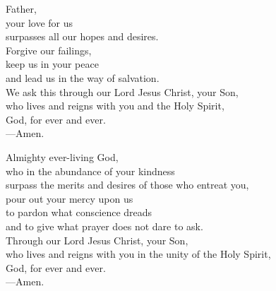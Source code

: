 \prayer


\begin{prayerverse}
Father,\\
your love for us\\
surpasses all our hopes and desires.\\
Forgive our failings,\\
keep us in your peace\\
and lead us in the way of salvation.\\
We ask this through our Lord Jesus Christ, your Son,\\
who lives and reigns with you and the Holy Spirit,\\
God, for ever and ever.\\
{\color{red}---\thinspace}Amen.
\end{prayerverse}


\begin{prayerverse}
Almighty ever-living God,\\
who in the abundance of your kindness\\
surpass the merits and desires of those who entreat you,\\
pour out your mercy upon us\\
to pardon what conscience dreads\\
and to give what prayer does not dare to ask.\\
Through our Lord Jesus Christ, your Son,\\
who lives and reigns with you in the unity of the Holy Spirit,\\
God, for ever and ever.\\
{\color{red}---\thinspace}Amen.
\end{prayerverse}

